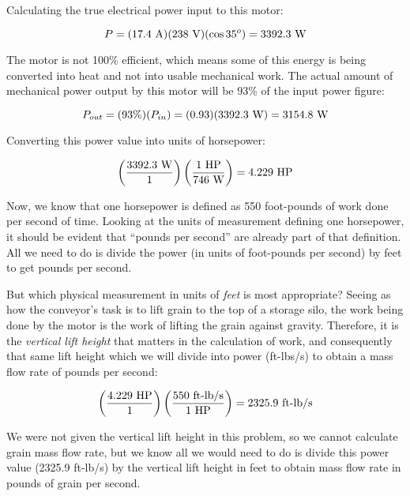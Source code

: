 Calculating the true electrical power input to this motor:

$$P = (17.4 \hbox{ A}) (238 \hbox{ V}) (\cos 35^o) = 3392.3 \hbox{ W}$$

The motor is not 100\% efficient, which means some of this energy is being converted into heat and not into usable mechanical work.  The actual amount of mechanical power output by this motor will be 93\% of the input power figure:

$$P_{out} = (93\%) (P_{in}) = (0.93) (3392.3 \hbox{ W}) = 3154.8 \hbox{ W}$$

Converting this power value into units of horsepower:

$$\left(3392.3 \hbox{ W} \over 1 \right)  \left(1 \hbox{ HP} \over 746 \hbox{ W}\right) = 4.229 \hbox{ HP}$$

\vskip 10pt

Now, we know that one horsepower is defined as 550 foot-pounds of work done per second of time.  Looking at the units of measurement defining one horsepower, it should be evident that ``pounds per second'' are already part of that definition.  All we need to do is divide the power (in units of foot-pounds per second) by feet to get pounds per second.

But which physical measurement in units of {\it feet} is most appropriate?  Seeing as how the conveyor's task is to lift grain to the top of a storage silo, the work being done by the motor is the work of lifting the grain against gravity.  Therefore, it is the {\it vertical lift height} that matters in the calculation of work, and consequently that same lift height which we will divide into power (ft-lbs/s) to obtain a mass flow rate of pounds per second:

$$\left(4.229 \hbox{ HP} \over 1 \right)  \left( 550 \hbox{ ft-lb/s} \over 1 \hbox{ HP} \right) = 2325.9 \hbox{ ft-lb/s}$$

We were not given the vertical lift height in this problem, so we cannot calculate grain mass flow rate, but we know all we would need to do is divide this power value (2325.9 ft-lb/s) by the vertical lift height in feet to obtain mass flow rate in pounds of grain per second.




